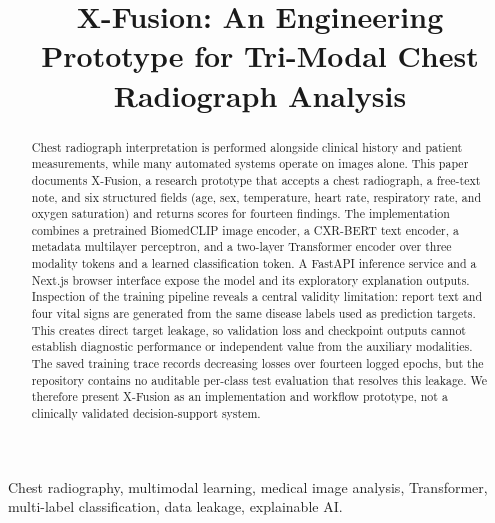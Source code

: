 \documentclass[conference]{IEEEtran}
\begin{document}
\title{X-Fusion: An Engineering Prototype for Tri-Modal Chest Radiograph Analysis}

\author{
}

\maketitle

\begin{abstract}
Chest radiograph interpretation is performed alongside clinical history and patient measurements, while many automated systems operate on images alone. This paper documents X-Fusion, a research prototype that accepts a chest radiograph, a free-text note, and six structured fields (age, sex, temperature, heart rate, respiratory rate, and oxygen saturation) and returns scores for fourteen findings. The implementation combines a pretrained BiomedCLIP image encoder, a CXR-BERT text encoder, a metadata multilayer perceptron, and a two-layer Transformer encoder over three modality tokens and a learned classification token. A FastAPI inference service and a Next.js browser interface expose the model and its exploratory explanation outputs. Inspection of the training pipeline reveals a central validity limitation: report text and four vital signs are generated from the same disease labels used as prediction targets. This creates direct target leakage, so validation loss and checkpoint outputs cannot establish diagnostic performance or independent value from the auxiliary modalities. The saved training trace records decreasing losses over fourteen logged epochs, but the repository contains no auditable per-class test evaluation that resolves this leakage. We therefore present X-Fusion as an implementation and workflow prototype, not a clinically validated decision-support system.
\end{abstract}

\begin{IEEEkeywords}
Chest radiography, multimodal learning, medical image analysis, Transformer, multi-label classification, data leakage, explainable AI.
\end{IEEEkeywords}
\end{document}
